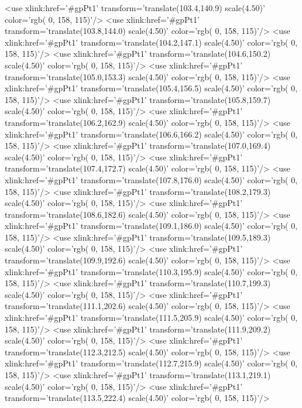 	<use xlink:href='#gpPt1' transform='translate(103.4,140.9) scale(4.50)' color='rgb(  0, 158, 115)'/>
	<use xlink:href='#gpPt1' transform='translate(103.8,144.0) scale(4.50)' color='rgb(  0, 158, 115)'/>
	<use xlink:href='#gpPt1' transform='translate(104.2,147.1) scale(4.50)' color='rgb(  0, 158, 115)'/>
	<use xlink:href='#gpPt1' transform='translate(104.6,150.2) scale(4.50)' color='rgb(  0, 158, 115)'/>
	<use xlink:href='#gpPt1' transform='translate(105.0,153.3) scale(4.50)' color='rgb(  0, 158, 115)'/>
	<use xlink:href='#gpPt1' transform='translate(105.4,156.5) scale(4.50)' color='rgb(  0, 158, 115)'/>
	<use xlink:href='#gpPt1' transform='translate(105.8,159.7) scale(4.50)' color='rgb(  0, 158, 115)'/>
	<use xlink:href='#gpPt1' transform='translate(106.2,162.9) scale(4.50)' color='rgb(  0, 158, 115)'/>
	<use xlink:href='#gpPt1' transform='translate(106.6,166.2) scale(4.50)' color='rgb(  0, 158, 115)'/>
	<use xlink:href='#gpPt1' transform='translate(107.0,169.4) scale(4.50)' color='rgb(  0, 158, 115)'/>
	<use xlink:href='#gpPt1' transform='translate(107.4,172.7) scale(4.50)' color='rgb(  0, 158, 115)'/>
	<use xlink:href='#gpPt1' transform='translate(107.8,176.0) scale(4.50)' color='rgb(  0, 158, 115)'/>
	<use xlink:href='#gpPt1' transform='translate(108.2,179.3) scale(4.50)' color='rgb(  0, 158, 115)'/>
	<use xlink:href='#gpPt1' transform='translate(108.6,182.6) scale(4.50)' color='rgb(  0, 158, 115)'/>
	<use xlink:href='#gpPt1' transform='translate(109.1,186.0) scale(4.50)' color='rgb(  0, 158, 115)'/>
	<use xlink:href='#gpPt1' transform='translate(109.5,189.3) scale(4.50)' color='rgb(  0, 158, 115)'/>
	<use xlink:href='#gpPt1' transform='translate(109.9,192.6) scale(4.50)' color='rgb(  0, 158, 115)'/>
	<use xlink:href='#gpPt1' transform='translate(110.3,195.9) scale(4.50)' color='rgb(  0, 158, 115)'/>
	<use xlink:href='#gpPt1' transform='translate(110.7,199.3) scale(4.50)' color='rgb(  0, 158, 115)'/>
	<use xlink:href='#gpPt1' transform='translate(111.1,202.6) scale(4.50)' color='rgb(  0, 158, 115)'/>
	<use xlink:href='#gpPt1' transform='translate(111.5,205.9) scale(4.50)' color='rgb(  0, 158, 115)'/>
	<use xlink:href='#gpPt1' transform='translate(111.9,209.2) scale(4.50)' color='rgb(  0, 158, 115)'/>
	<use xlink:href='#gpPt1' transform='translate(112.3,212.5) scale(4.50)' color='rgb(  0, 158, 115)'/>
	<use xlink:href='#gpPt1' transform='translate(112.7,215.9) scale(4.50)' color='rgb(  0, 158, 115)'/>
	<use xlink:href='#gpPt1' transform='translate(113.1,219.1) scale(4.50)' color='rgb(  0, 158, 115)'/>
	<use xlink:href='#gpPt1' transform='translate(113.5,222.4) scale(4.50)' color='rgb(  0, 158, 115)'/>
